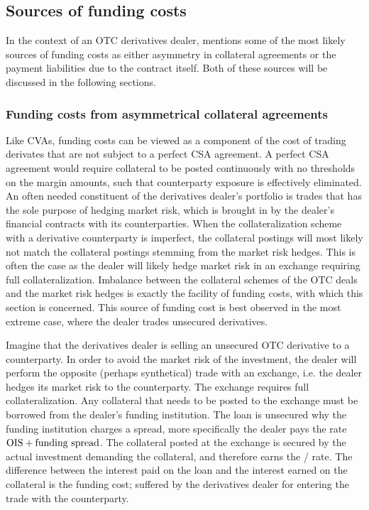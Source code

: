 \documentclass[../../../main.tex]{subfiles}
\begin{document}
    \subsection{Sources of funding costs}
        In the context of an OTC derivatives dealer, 
        \cite{Ruiz2013FVA} mentions some of the most likely sources of funding costs as
        either asymmetry in collateral agreements or the payment liabilities due to the contract itself.
        Both of these sources will be discussed in the following sections.

    \subsubsection{Funding costs from asymmetrical collateral agreements}
        Like CVAs, funding costs can be viewed as a component of the cost of trading derivates
        that are not subject to a perfect CSA agreement.
        A perfect CSA agreement would require collateral to be posted continuously with no thresholds on the margin amounts,
        such that counterparty exposure is effectively eliminated.
        An often needed constituent of the derivatives dealer's portfolio
        is trades that has the sole purpose of hedging market risk,
        which is brought in by the dealer's financial contracts with its counterparties.
        When the collateralization scheme with a derivative counterparty is imperfect, 
        the collateral postings will most likely not match the collateral postings stemming from the market risk hedges.
        This is often the case as the dealer will likely hedge market risk in an exchange requiring full collateralization.
        Imbalance between the collateral schemes of the OTC deals and the market risk hedges
        is exactly the facility of funding costs, with which this section is concerned.
        This source of funding cost is best observed in the most extreme case, where the dealer trades unsecured derivatives. 

        Imagine that the derivatives dealer is selling an unsecured OTC derivative to a counterparty.
        In order to avoid the market risk of the investment, 
        the dealer will perform the opposite (perhaps synthetical) trade with an exchange,
        i.e. the dealer hedges its market risk to the counterparty.
        The exchange requires full collateralization.
        Any collateral that needs to be posted to the exchange must be borrowed from the dealer's funding institution.
        The loan is unsecured why the funding institution charges a spread,
        more specifically the dealer pays the rate $\OIS/ + \text{funding spread}$.
        The collateral posted at the exchange is secured by the actual investment demanding the collateral,
        and therefore earns the \OIS/ rate.
        The difference between the interest paid on the loan and the interest earned on the collateral is the funding cost;
        suffered by the derivatives dealer for entering the trade with the counterparty. 
\end{document}
